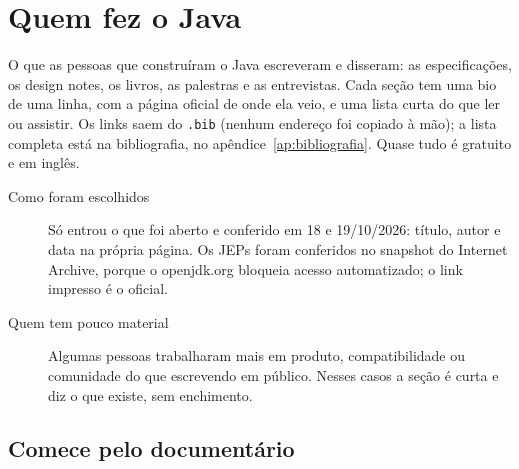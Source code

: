 \chapter{Quem fez o Java}
\label{ap:pessoas}

O que as pessoas que construíram o Java escreveram e disseram: as
especificações, os design notes, os livros, as palestras e as entrevistas.
Cada seção tem uma bio de uma linha, com a página oficial de onde ela veio,
e uma lista curta do que ler ou assistir. Os links saem do \texttt{.bib}
(nenhum endereço foi copiado à mão); a lista completa está na
bibliografia, no apêndice~\ref{ap:bibliografia}. Quase tudo é gratuito e em
inglês.

\begin{description}
\item[Como foram escolhidos] Só entrou o que foi aberto e conferido em 18
  e 19/10/2026: título, autor e data na própria página. Os JEPs foram
  conferidos no snapshot do Internet Archive, porque o openjdk.org bloqueia
  acesso automatizado; o link impresso é o oficial.
\item[Quem tem pouco material] Algumas pessoas trabalharam mais em produto,
  compatibilidade ou comunidade do que escrevendo em público. Nesses casos
  a seção é curta e diz o que existe, sem enchimento.
\end{description}

\section{Comece pelo documentário}
\begin{itemize}
\end{itemize}









